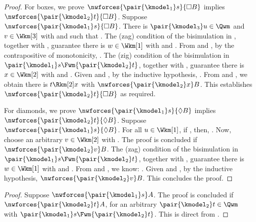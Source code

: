 \begin{proof}
    \medskip
    \noindent
    For boxes, we prove $\nwforces {\pair {\kmodel_1} s} {\Box B}$ implies $\nwforces {\pair {\kmodel_2} t} {\Box B}$.
    Suppose $\nwforces {\pair {\kmodel_1} s} {\Box B}$.
    There is ${\pair {\kmodel_3} u} \in \Qwm$ and $v \in \Wkm[3]$ with
         and
         such that .
    The (zag) condition of the bisimulation in , together with , guarantee there is $w \in \Wkm[1]$ with
         and
        .
    From  and , by the contrapositive of monotonicity,
        .
    The (zig) condition of the bisimulation in ${\pair {\kmodel_1} s} \Fwm {\pair {\kmodel_2} t}$, together with , guarantee there is $x \in \Wkm[2]$ with
         and
        .
    Given  and , by the inductive hypothesis,
        .
    From  and , we obtain there is $t \Rkm[2] x$ with $\nwforces {\pair {\kmodel_2} x} B$.
    This establishes $\nwforces {\pair {\kmodel_2} t} {\Box B}$ as required.

    \medskip
    \noindent
    For diamonds, we prove $\nwforces {\pair {\kmodel_1} s} {\Diamond B}$ implies $\nwforces {\pair {\kmodel_2} t} {\Diamond B}$.
    Suppose $\nwforces {\pair {\kmodel_1} s} {\Diamond B}$.
    For all $u \in \Wkm[1]$, if , then, .
    Now, choose an arbitrary $v \in \Wkm[2]$ with .
    The proof is concluded if $\nwforces {\pair {\kmodel_2} v} B$.
    The (zag) condition of the bisimulation in ${\pair {\kmodel_1} s} \Fwm {\pair {\kmodel_2} t}$, together with , guarantee there is $w \in \Wkm[1]$ with
         and
        .
    From  and , we know:
        .
    Given  and , by the inductive hypothesis, $\nwforces {\pair {\kmodel_2} v} B$.
    This concludes the proof.
\end{proof}

\begin{proof}
    Suppose $\nwforces {\pair {\kmodel_1} s} A$.
    The proof is concluded if $\nwforces {\pair {\kmodel_2} t} A$, for an arbitrary ${\pair {\kmodel_2} t} \in \Qwm$ with ${\pair {\kmodel_1} s} \Fwm {\pair {\kmodel_2} t}$.
    This is direct from .
\end{proof}

